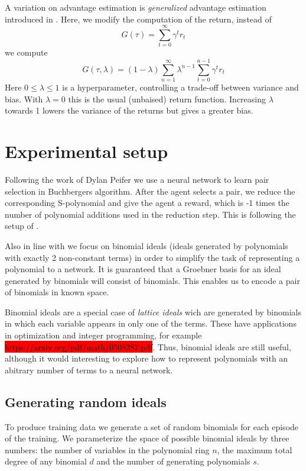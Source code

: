 \documentclass{article}
\theoremstyle{changedot}
\theoremstyle{changedotbreak}
\theoremstyle{nonumberplain}
\begin{document}
A variation on advantage estimation is \emph{generalized} advantage estimation introduced in \cite{GAE}. Here, we modify the computation of the return, instead of \[G(\tau) = \sum_{t=0}^{\infty} \gamma^{t} r_{t}\] we compute \[G(\tau, \lambda) = (1 - \lambda)\sum_{n=1}^{\infty} \lambda^{n-1} \sum_{t=0}^{n-1} \gamma^{t} r_{t}\] Here $0 \leq \lambda \leq 1$ is a hyperparameter, controlling a trade-off between variance and bias. With $\lambda = 0$ this is the usual (unbaised) return function. Increasing $\lambda$ towards 1 lowers the variance of the returns but gives a greater bias.




\section{Experimental setup}
Following the work of Dylan Peifer \cite{peifer} we use a neural network to learn pair selection in Buchbergers algorithm. After the agent selects a pair, we reduce the corresponding S-polynomial and give the agent a reward, which is -1 times the number of polynomial additions used in the reduction step. This is following the setup of \cite{peifer}.

Also in line with \cite{peifer} we focus on binomial ideals (ideals generated by polynomials with exactly 2 non-constant terms) in order to simplify the task of representing a polynomial to a network. It is guaranteed that a Groebner basis for an ideal generated by binomials will consist of binomials. This enables us to encode a pair of binomials in known space.

Binomial ideals are a special case of \emph{lattice ideals} wich are generated by binomials in which each variable appears in only one of the terms. These have applications in optimization and integer programming, for example \colorbox{red}{https://arxiv.org/pdf/math/0508287.pdf}. Thus, binomial ideals are still useful, although it would interesting to explore how to represent polynomials with an abitrary number of terms to a neural network.

\subsection{Generating random ideals}
To produce training data we generate a set of random binomials for each episode of the training. We parameterize the space of possible binomial ideals by three numbers: the number of variables in the polynomial ring $n$, the maximum total degree of any binomial $d$ and the number of generating polynomials $s$.
\end{document}
